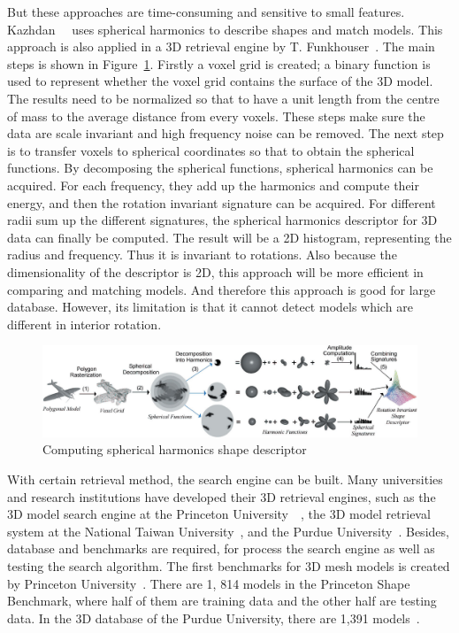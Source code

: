 But these approaches are time-consuming and sensitive to small features. Kazhdan~\etal~\cite{kazhdan2003rotation} uses spherical harmonics to describe shapes and match models. This approach is also applied in a 3D retrieval engine by T. Funkhouser~\cite{Funkhouser:2003:SEM:588272.588279}. The main steps is shown in Figure~\ref{background_sphericalharmonics}. Firstly a voxel grid is created; a binary function is used to represent whether the voxel grid contains the surface of the 3D model.  The results need to be normalized so that to have a unit length from the centre of mass to the average distance from every voxels. These steps make sure the data are scale invariant and high frequency noise can be removed. The next step is to transfer voxels to spherical coordinates so that to obtain the spherical functions. By decomposing the spherical functions, spherical harmonics can be acquired. For each frequency, they add up the harmonics and compute their energy, and then the rotation invariant signature can be acquired. For different radii sum up the different signatures, the spherical harmonics descriptor for 3D data can finally be computed. The result will be a 2D histogram, representing the radius and frequency. Thus it is invariant to rotations. Also because the dimensionality of the descriptor is 2D, this approach will be more efficient in comparing and matching models. And therefore this approach is good for large database. However, its limitation is that it cannot detect models which are different in interior rotation. 

\begin{figure}[h]
\centering
\includegraphics[width=0.9\linewidth]{background_sphericalharmonics}
\caption{Computing spherical harmonics shape descriptor~\cite{Funkhouser:2003:SEM:588272.588279}} \label{background_sphericalharmonics}
\end{figure}


With certain retrieval method, the search engine can be built. Many universities and research institutions have developed their 3D retrieval engines, such as the 3D model search engine at the Princeton University~\cite{shilane2004princeton}~\cite{min2003early}, the 3D model retrieval system at the National Taiwan University~\cite{shen20033d}, and the Purdue University~\cite{iyer2005engineering}. Besides, database and benchmarks are required, for process the search engine as well as testing the search algorithm. The first benchmarks for 3D mesh models is created by Princeton University~\cite{shilane2004princeton}. There are 1, 814 models in the Princeton Shape Benchmark, where half of them are training data and the other half are testing data. In the 3D database of the Purdue University, there are 1,391 models~\cite{iyer2005engineering}.

